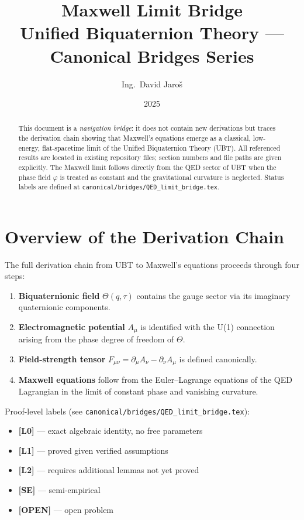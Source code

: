 \documentclass[11pt,a4paper]{article}
\title{Maxwell Limit Bridge\\
\large Unified Biquaternion Theory — Canonical Bridges Series}
\author{Ing.\ David Jaroš}
\date{2025}
\newcommand{\Lzero}{\textbf{[L0]}}
\newcommand{\Lone}{\textbf{[L1]}}
\newcommand{\Ltwo}{\textbf{[L2]}}
\newcommand{\SE}{\textbf{[SE]}}
\newcommand{\OPEN}{\textbf{[OPEN]}}
\begin{document}
\maketitle

\begin{abstract}
This document is a \emph{navigation bridge}: it does not contain new derivations
but traces the derivation chain showing that Maxwell's equations emerge as a
classical, low-energy, flat-spacetime limit of the Unified Biquaternion Theory (UBT).
All referenced results are located in existing repository files; section numbers
and file paths are given explicitly. The Maxwell limit follows directly from the
QED sector of UBT when the phase field $\varphi$ is treated as constant and the
gravitational curvature is neglected. Status labels are defined at
\texttt{canonical/bridges/QED\_limit\_bridge.tex}.
\end{abstract}

\tableofcontents
\newpage

\section{Overview of the Derivation Chain}

The full derivation chain from UBT to Maxwell's equations proceeds through
four steps:

\begin{enumerate}
  \item \textbf{Biquaternionic field} $\Theta(q,\tau)$ contains the gauge sector
        via its imaginary quaternionic components.
  \item \textbf{Electromagnetic potential} $A_\mu$ is identified with the
        U(1) connection arising from the phase degree of freedom of $\Theta$.
  \item \textbf{Field-strength tensor} $F_{\mu\nu} = \partial_\mu A_\nu - \partial_\nu A_\mu$
        is defined canonically.
  \item \textbf{Maxwell equations} follow from the Euler--Lagrange equations of
        the QED Lagrangian in the limit of constant phase and vanishing curvature.
\end{enumerate}

\noindent Proof-level labels (see \texttt{canonical/bridges/QED\_limit\_bridge.tex}):
\begin{itemize}
  \item \Lzero{} — exact algebraic identity, no free parameters
  \item \Lone{} — proved given verified assumptions
  \item \Ltwo{} — requires additional lemmas not yet proved
  \item \SE{} — semi-empirical
  \item \OPEN{} — open problem
\end{itemize}
\end{document}
